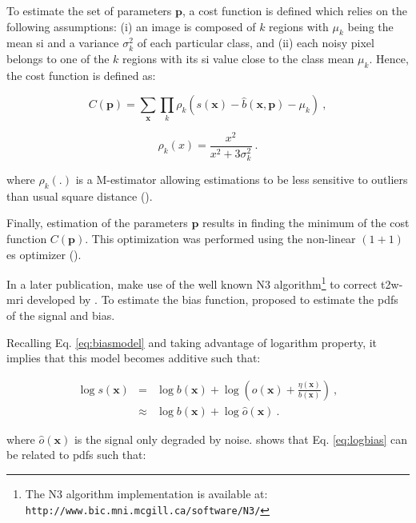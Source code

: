 \begin{enumerate}[leftmargin=*]
To estimate the set of parameters $\mathbf{p}$, a cost function is defined which relies on the following assumptions: (i) an image is composed of $k$ regions with $\mu_k$ being the mean \ac{si} and a variance $\sigma^{2}_{k}$ of each particular class, and (ii) each noisy pixel belongs to one of the $k$ regions with its \ac{si} value close to the class mean $\mu_k$. Hence, the cost function is defined as:

\begin{equation}
	C(\mathbf{p}) = \sum_{\mathbf{x}} \prod_{k} \rho_k(s(\mathbf{x}) - \hat{b}(\mathbf{x},\mathbf{p}) - \mu_k) \ ,
	\label{eq:costbias}
\end{equation}

\begin{equation}
	\rho_k(x) = \frac{x^2}{x^2 + 3 \sigma_k^2} \ .
	\label{eq:mestbias}
\end{equation}

\noindent where $\rho_k(.)$ is a M-estimator allowing estimations to be less sensitive to outliers than usual square distance (\cite{Li1996}).

Finally, estimation of the parameters $\mathbf{p}$ results in finding the minimum of the cost function $C(\mathbf{p})$. This optimization was performed using the non-linear $(1+1)$ \ac{es} optimizer (\cite{Styner1997}).

In a later publication, \cite{Viswanath2012} make use of the well known N3 algorithm\footnote{The N3 algorithm implementation is available at: \texttt{http://www.bic.mni.mcgill.ca/\allowbreak software/N3/}} to correct \ac{t2w}-\ac{mri} developed by \cite{Sled1998}. To estimate the bias function, \cite{Sled1998} proposed to estimate the \acp{pdf} of the signal and bias.

Recalling Eq. \ref{eq:biasmodel} and taking advantage of logarithm property, it implies that this model becomes additive such that:

\begin{eqnarray}
	\log s(\mathbf{x}) & = & \log b(\mathbf{x}) + \log \left( o(\mathbf{x}) + \frac{\eta(\mathbf{x})}{b(\mathbf{x})} \right) \ , \nonumber \\
	& \approx & \log b(\mathbf{x}) + \log \hat{o}(\mathbf{x}) \ . \label{eq:logbias}
\end{eqnarray}

\noindent where $\hat{o}(\mathbf{x})$ is the signal only degraded by noise. \cite{Sled1998} shows that Eq. \ref{eq:logbias} can be related to \acp{pdf} such that:


\end{enumerate}
